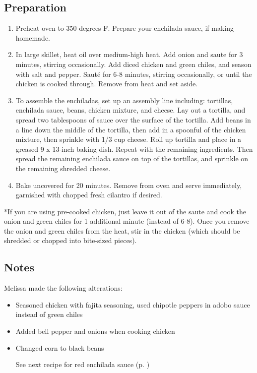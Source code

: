 \subsection{Preparation}
\begin{enumerate}
    \item Preheat oven to 350 degrees F.  Prepare your enchilada sauce, if making homemade.
    \item In large skillet, heat oil over medium-high heat. Add onion and saute for 3 minutes, stirring occasionally.  Add diced chicken and green chiles, and season with salt and pepper.  Saut\'{e} for 6-8 minutes, stirring occasionally, or until the chicken is cooked through.  Remove from heat and set aside.
    \item To assemble the enchiladas, set up an assembly line including: tortillas, enchilada sauce, beans, chicken mixture, and cheese. Lay out a tortilla, and spread two tablespoons of sauce over the surface of the tortilla.  Add beans in a line down the middle of the tortilla, then add in a spoonful of the chicken mixture, then sprinkle with 1/3 cup cheese. Roll up tortilla and place in a greased 9 x 13-inch baking dish. Repeat with the remaining ingredients.  Then spread the remaining enchilada sauce on top of the tortillas, and sprinkle on the remaining shredded cheese.
    \item Bake uncovered for 20 minutes.  Remove from oven and serve immediately, garnished with chopped fresh cilantro if desired.
\end{enumerate}
*If you are using pre-cooked chicken, just leave it out of the saute and cook the onion and green chiles for 1 additional minute (instead of 6-8).  Once you remove the onion and green chiles from the heat, stir in the chicken (which should be shredded or chopped into bite-sized pieces).

\subsection{Notes}
Melissa made the following alterations:
\begin{itemize}
    \item Seasoned chicken with fajita seasoning, used chipotle peppers in adobo sauce instead of green chiles
    \item Added bell pepper and onions when cooking chicken
    \item Changed corn to black beans

See next recipe for red enchilada sauce (p. \pageref{red-enchilada-sauce})
\end{itemize}
